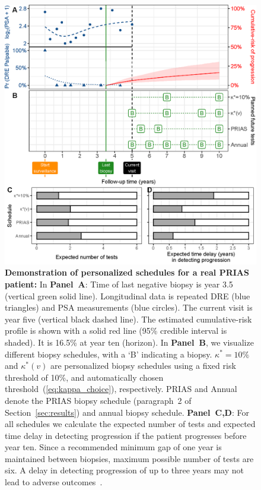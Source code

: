 \begin{figure}
\centerline{\includegraphics{images/demo_schedule.eps}}
\caption{\textbf{Demonstration of personalized schedules for a real PRIAS patient:} In \textbf{Panel~A}: Time of last negative biopsy is year 3.5 (vertical green solid line). Longitudinal data is repeated DRE (blue triangles) and PSA measurements (blue circles). The current visit is year five (vertical black dashed line). The estimated cumulative-risk profile is shown with a solid red line (95\% credible interval is shaded). It is 16.5\% at year ten (horizon). In \textbf{Panel~B}, we visualize different biopsy schedules, with a `B' indicating a biopsy. \textbf{$\kappa^*=10\%$} and \textbf{$\kappa^*(v)$} are personalized biopsy schedules using a fixed risk threshold of 10\%, and automatically chosen threshold~(\ref{eq:kappa_choice}), respectively. PRIAS and Annual denote the PRIAS biopsy schedule (paragraph~2 of Section~\ref{sec:results}) and annual biopsy schedule. \textbf{Panel~C,D}: For all schedules we calculate the expected number of tests and expected time delay in detecting progression if the patient progresses before year ten. Since a recommended minimum gap of one year is maintained between biopsies, maximum possible number of tests are six.  A delay in detecting progression of up to three years may not lead to adverse outcomes~\citep{carvalho}. }\label{fig:demo_schedule}
\end{figure}